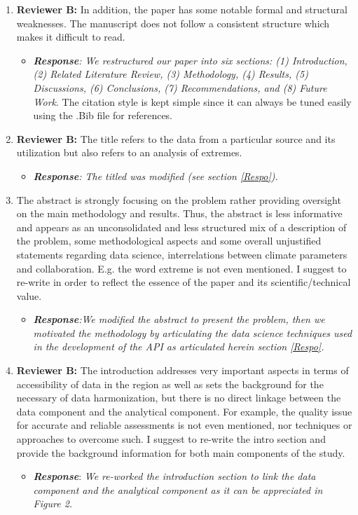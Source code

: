 \documentclass[a4paper, 12pt, conference]{ieeeconf}      %
\begin{document}
\begin{enumerate}
	\item  \textbf{Reviewer B:} In addition, the paper has some notable formal and structural weaknesses. The manuscript does not follow a consistent structure which makes it difficult to read.
	\begin{itemize}
		\item \emph{\textbf{Response}: We restructured our paper into six sections: (1) Introduction, (2) Related Literature Review, (3) Methodology, (4) Results, (5) Discussions, (6) Conclusions, (7) Recommendations, and (8) Future Work}. The citation style is kept simple since it can always be tuned easily using the .Bib file for references.
	\end{itemize}
	
	\item \textbf{Reviewer B:}  The title refers to the data from a particular source and its utilization but also refers to an analysis of extremes.
	\begin{itemize}
		\item  \emph{\textbf{Response}: The titled was modified (see section \ref{Respo}).}
	\end{itemize}

	\item The abstract is strongly focusing on the problem rather providing oversight on the main methodology and results. Thus, the abstract is less informative and appears as an unconsolidated and less structured mix of a description of the problem, some methodological aspects and some overall unjustified statements regarding data science, interrelations between climate parameters and collaboration. E.g. the word extreme is not even mentioned. I suggest to re-write in order to reflect the essence of the paper and its scientific/technical value.
	\begin{itemize}
		\item 	 \emph{\textbf{Response}:We modified the abstract to present the problem, then we motivated the methodology by articulating  the data science techniques  used in the development of the API as articulated herein section \ref{Respo}.}
	\end{itemize}

	\item \textbf{Reviewer B:}  The introduction addresses very important aspects in terms of accessibility of data in the region as well as sets the background for the necessary of data harmonization, but there is no direct linkage between the data component and the analytical component. For example, the quality issue for accurate and reliable assessments is not even mentioned, nor techniques or approaches to overcome such. I suggest to re-write the intro section and provide the background information for both main components of the study.
	\begin{itemize}
		\item \textbf{\emph{Response}}: \emph{We re-worked the introduction section to link  the data component and the analytical component as it can be appreciated in Figure 2.}
	\end{itemize}


\end{enumerate}
\end{document}
